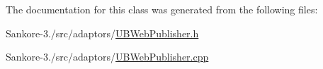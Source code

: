 The documentation for this class was generated from the following files\-:\begin{DoxyCompactItemize}
\item 
Sankore-\/3./src/adaptors/\hyperlink{_u_b_web_publisher_8h}{U\-B\-Web\-Publisher.\-h}\item 
Sankore-\/3./src/adaptors/\hyperlink{_u_b_web_publisher_8cpp}{U\-B\-Web\-Publisher.\-cpp}\end{DoxyCompactItemize}

